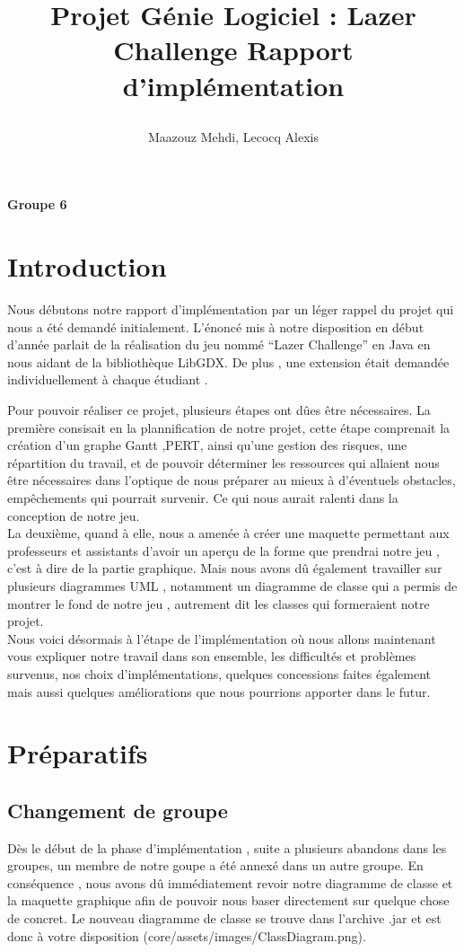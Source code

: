 \documentclass[a4paper,10pt]{article}
\title{
    \begin{minipage}\linewidth
        \centering\bfseries\sffamily
        Projet Génie Logiciel : Lazer Challenge
        \vskip3pt
        \large Rapport d'implémentation
    \end{minipage}
    }
\author{Maazouz Mehdi, Lecocq Alexis}
\begin{document}
\maketitle
\textbf{Groupe 6}
\tableofcontents
\newpage
\section{Introduction}
  Nous débutons notre rapport d'implémentation par un léger rappel du projet qui nous a été demandé initialement. 
L'énoncé mis à notre disposition en début d'année parlait de la réalisation du jeu nommé ``Lazer Challenge'' en Java
en nous aidant de la bibliothèque LibGDX. De plus , une extension était demandée individuellement à chaque étudiant .

Pour pouvoir réaliser ce projet, plusieurs étapes ont dûes être nécessaires. La première consisait en la plannification de notre projet,
 cette étape comprenait la création d'un graphe Gantt ,PERT, ainsi qu'une gestion des risques, une répartition du travail,
 et de pouvoir déterminer les ressources qui allaient nous être nécessaires dans l'optique de nous préparer au mieux à d'éventuels
 obstacles, empêchements qui pourrait survenir. Ce qui nous aurait ralenti dans la conception de notre jeu.\\ La deuxième, quand à elle, nous a amenée
 à créer une maquette permettant aux professeurs et assistants d'avoir un aperçu de la forme que prendrai notre jeu , c'est à dire de la partie graphique.
 Mais nous avons dû également travailler sur plusieurs diagrammes UML , notamment un diagramme de classe qui a permis de montrer le fond de notre jeu , autrement dit les classes
 qui formeraient notre projet.\\
 Nous voici désormais à l'étape de l'implémentation où nous allons maintenant vous expliquer notre travail dans son ensemble,
 les difficultés et problèmes survenus, nos choix d'implémentations, quelques concessions faites également mais aussi quelques améliorations que nous
 pourrions apporter dans le futur.
\section{Préparatifs}
\subsection{Changement de groupe} 
Dès le début de la phase d'implémentation , suite a plusieurs abandons dans les groupes, un membre de notre goupe a été annexé dans un autre groupe.
En conséquence , nous avons dû immédiatement revoir notre diagramme de classe et la maquette graphique afin de pouvoir nous baser directement sur quelque chose
de concret. Le nouveau diagramme de classe se trouve dans l'archive .jar et est donc à votre disposition (core/assets/images/ClassDiagram.png).
\end{document}
